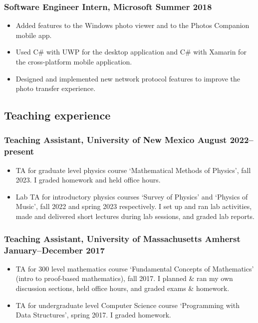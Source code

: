 \documentclass{article}
\begin{document}
		\subsubsection*{Software Engineer Intern, Microsoft \hfill \normalfont \normalsize Summer 2018}
		\begin{itemize}
			\item Added features to the Windows photo viewer and to the Photos Companion mobile app.
			\item Used C\# with UWP for the desktop application and C\# with Xamarin for the cross-platform mobile application.
			\item Designed and implemented new network protocol features to improve the photo transfer experience.
		\end{itemize}
	
	\subsection*{Teaching experience}
		\subsubsection*{Teaching Assistant, University of New Mexico \hfill \normalfont \normalsize August 2022--present}
		\begin{itemize}
			\item TA for graduate level physics course `Mathematical Methods of Physics', fall 2023. I graded homework and held office hours.
			\item Lab TA for introductory physics courses `Survey of Physics' and `Physics of Music', fall 2022 and spring 2023 respectively. I set up and ran lab activities, made and delivered short lectures during lab sessions, and graded lab reports.
		\end{itemize}
		\subsubsection*{Teaching Assistant, University of Massachusetts Amherst \hfill \normalfont \normalsize January--December 2017}
			\begin{itemize}
			\item TA for 300 level mathematics course `Fundamental Concepts of Mathematics' (intro to proof-based mathematics), fall 2017. I planned \& ran my own discussion sections, held office hours, and graded exams \& homework.
			\item TA for undergraduate level Computer Science course `Programming with Data Structures', spring 2017. I graded homework.
			\end{itemize}
\end{document}
